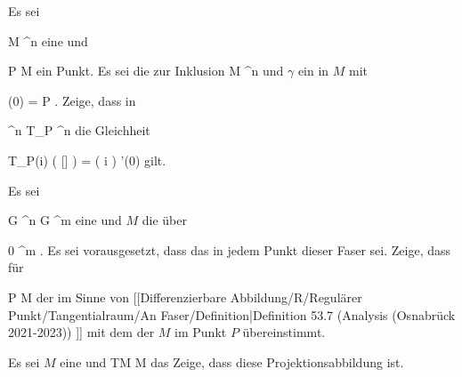 {}
{

Es sei

\mavergleichskette
{\vergleichskette
{ M
}
{ \subseteq }{ \R^n
}
{  }{
}
{    }{
}
{   }{
}
}
{}{}{}
eine
und

\mavergleichskette
{\vergleichskette
{ P
}
{ \in }{ M
}
{  }{
}
{    }{
}
{   }{
}
}
{}{}{}
ein Punkt. Es sei
 die
zur Inklusion
 { M } {\R^n
} {}
und $\gamma$ ein
in $M$ mit

\mavergleichskettedisp
{\vergleichskette
{ \gamma(0)
}
{ =} { P
}
{ } {
}
{ } {
}
{ } {
}
}
{}{}{.}
Zeige, dass in

\mavergleichskette
{\vergleichskette
{ \R^n
}
{ \cong }{ T_P \R^n
}
{  }{
}
{    }{
}
{   }{
}
}
{}{}{}
die Gleichheit

\mavergleichskettedisp
{\vergleichskette
{ T_P(i) ( [\gamma] )
}
{ =} { \left(  i \circ \gamma  \right) '(0)
}
{ } {
}
{ } {
}
{ } {
}
}
{}{}{}
gilt.

}
{} {}

{}
{

Es sei

\mavergleichskette
{\vergleichskette
{ G
}
{ \subseteq }{ \R^n
}
{  }{
}
{    }{
}
{   }{
}
}
{}{}{}
\maabb {\varphi} { G } {\R^m
} {}
eine
und $M$ die
über

\mavergleichskette
{\vergleichskette
{ 0
}
{ \in }{ \R^m
}
{  }{
}
{    }{
}
{   }{
}
}
{}{}{.}
Es sei vorausgesetzt, dass das
in jedem Punkt dieser Faser
sei. Zeige, dass für

\mavergleichskette
{\vergleichskette
{ P
}
{ \in }{ M
}
{  }{
}
{    }{
}
{   }{
}
}
{}{}{}
der
im Sinne von
[[Differenzierbare Abbildung/R/Regulärer Punkt/Tangentialraum/An Faser/Definition|Definition 53.7 (Analysis (Osnabrück 2021-2023))  ]]  mit dem
der
$M$ im Punkt $P$ übereinstimmt.

}
{} {}

{}
{

Es sei $M$ eine
und
\maabbdisp {\pi} {TM} {M
} {}
das
Zeige, dass diese Projektionsabbildung
ist.

}
{} {}

